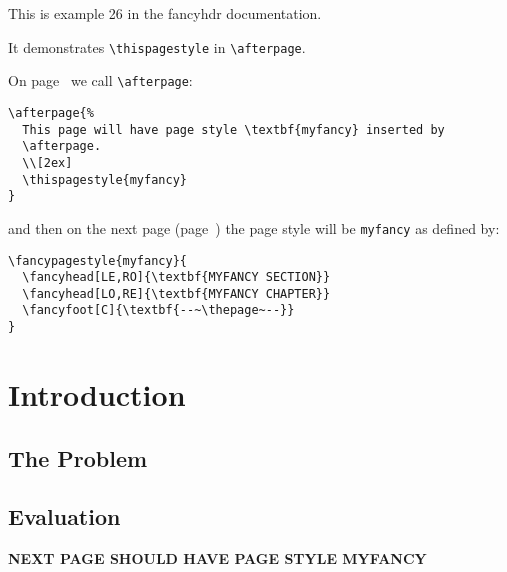 \documentclass[openany]{book}
\begin{document}
\tableofcontents

\bigskip

\thispagestyle{plain}
\noindent
\begin{boxedminipage}{\textwidth}
This is example 26 in the fancyhdr documentation.

It demonstrates \verb|\thispagestyle| in \verb|\afterpage|.

On page~\pageref{setafterpage} we call \verb|\afterpage|:
\begin{verbatim}
\afterpage{%
  This page will have page style \textbf{myfancy} inserted by
  \afterpage.
  \\[2ex]
  \thispagestyle{myfancy}
}
\end{verbatim}
and then on the next page (page~\pageref{afterpage})
 the page style will be \texttt{myfancy} as defined by:
\begin{verbatim}
\fancypagestyle{myfancy}{
  \fancyhead[LE,RO]{\textbf{MYFANCY SECTION}}
  \fancyhead[LO,RE]{\textbf{MYFANCY CHAPTER}}
  \fancyfoot[C]{\textbf{--~\thepage~--}}
}
\end{verbatim}

\end{boxedminipage}

\pagestyle{headings}

\chapter{Introduction}

\bigskip

\lipsum[1]

\section{The Problem}
\label{sec:problem}

\lipsum[2-3]

\section{Evaluation}


\label{setafterpage}\textbf{NEXT PAGE SHOULD HAVE PAGE STYLE MYFANCY}
\end{document}

